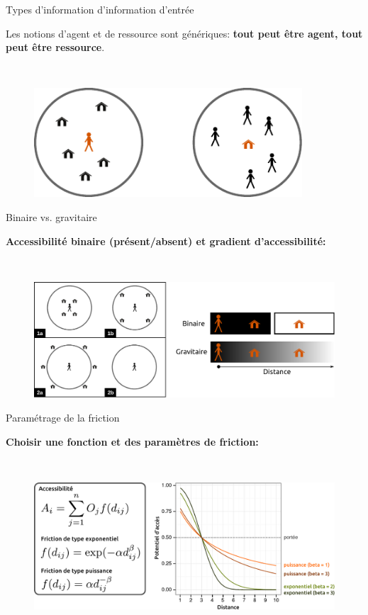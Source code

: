 \begin{frame}{Types d'information d'information d'entrée}

Les notions d'agent et de ressource sont génériques: \textbf{tout peut être agent, tout peut être ressource}.

~

\begin{figure}
  \includegraphics[width=10cm]{AgentRessource.pdf}
\end{figure}

\end{frame}


\begin{frame}{Binaire vs. gravitaire}

\textbf{Accessibilité binaire (présent/absent) et gradient d'accessibilité:}

~

\begin{figure}
  \includegraphics[width=12cm]{BinaireGravitaire.pdf}
\end{figure}

\end{frame}


\begin{frame}{Paramétrage de la friction}

\textbf{Choisir une fonction et des paramètres de friction:}

~

\begin{figure}
  \includegraphics[width=12cm]{FrictionDistance.pdf}
\end{figure}

\end{frame}


